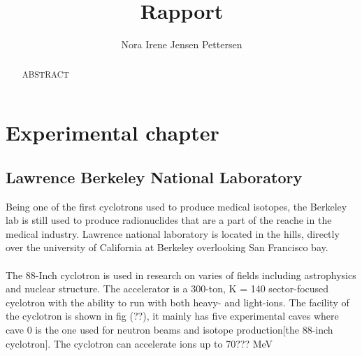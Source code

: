 \documentclass[11pt,showpacs,preprintnumbers,footinbib,amsmath,amssymb,aps,prl,groupedaddress,superscriptaddress,showkeys]{revtex4-1}
\begin{document}
\title{\Large{Rapport\\}}


\author{Nora Irene Jensen Pettersen}

\begin{abstract}
\centering
ABSTRACT
\end{abstract}

\maketitle

\newpage

\section{Experimental chapter}

\subsection{Lawrence Berkeley National Laboratory}
\noindent
Being one of the first cyclotrons used to produce medical isotopes, the Berkeley lab is still used to produce radionuclides that are a part of the reache in the medical industry. Lawrence national laboratory is located in the hills, directly over the university of California at Berkeley overlooking San Francisco bay.\\
\\
The 88-Inch cyclotron is used in research on varies of fields including astrophysics and nuclear structure. The accelerator is a 300-ton, K = 140 sector-focused cyclotron with the ability to run with both heavy- and light-ions. The facility of the cyclotron is shown in fig (??), it mainly has five experimental caves where cave 0 is the one used for neutron beams and isotope production[the 88-inch cyclotron]. The cyclotron can accelerate ions up to 70??? MeV 
\end{document}
